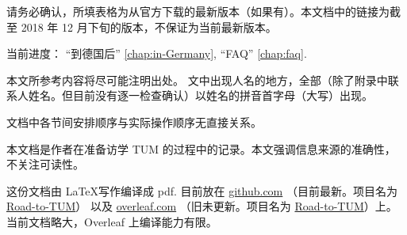 请务必确认，所填表格为从官方下载的最新版本（如果有）。本文档中的链接为截至 2018 年 12 月下旬的版本，不保证为当前最新版本。

当前进度：
“到德国后” \ref{chap:in-Germany}, ``FAQ'' \ref{chap:faq}.

本文所参考内容将尽可能注明出处。
文中出现人名的地方，全部（除了附录中联系人姓名。但目前没有逐一检查确认）以姓名的拼音首字母（大写）出现。


文档中各节间安排顺序与实际操作顺序无直接关系。
\vfill

本文档是作者在准备访学 TUM 的过程中的记录。本文强调信息来源的准确性，不关注可读性。

这份文档由 \LaTeX 写作编译成 pdf. 目前放在 \href{https://github.com}{github.com} （目前最新。项目名为 \href{https://github.com/Memcys/Road-to-TUM.git}{Road-to-TUM}） 以及 \href{https://www.overlear.com}{overleaf.com} （旧未更新。项目名为 \href{https://www.overleaf.com/2269426218fxwmgyxjywnn}{Road-to-TUM}）上。当前文档略大，Overleaf 上编译能力有限。